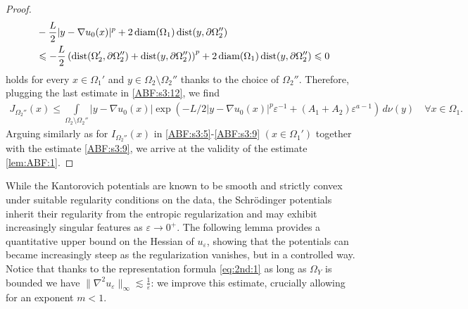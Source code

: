 \documentclass[reqno,12pt]{article}
\DeclareMathOperator{\dist}{dist}
\DeclareMathOperator{\diam}{diam}
\newcommand{\I}{\int\limits}
\begin{document}
\begin{proof}
\begin{align*}
    &-\frac{L}{2}|y-\nabla u_{0}(x)|^{p} + 2\diam(\Omega_{1})\dist(y,\partial\Omega_{2}'')
    \notag\\&
    \leqslant
    -\frac{L}{2}\left( \dist(\Omega_{2}',\partial \Omega_{2}'') + \dist(y,\partial \Omega_{2}'') \right)^{p} + 2\diam(\Omega_{1})\dist(y,\partial\Omega_{2}'') \leqslant 0 
\end{align*}
holds for every $x\in \Omega_{1}'$ and $y\in \Omega_{2}\setminus \Omega_{2}''$ thanks to the choice of $\Omega_{2}''$. Therefore, plugging the last estimate in \eqref{ABF:s3:12}, we find 
\begin{align*}
    J_{\Omega_{2}''}(x) \leqslant
    \I_{\Omega_{2}\setminus \Omega_{2}''} |y-\nabla u_{0}(x)|\exp\left(-L/2|y-\nabla u_{0}(x)|^{p}\varepsilon^{-1} + (A_{1}+A_{2})\varepsilon^{a-1}\right)\,d\nu(y)\quad
    \forall x\in\Omega_{1}.
\end{align*}
Arguing similarly as for $I_{\Omega_{2}''}(x)$ in \eqref{ABF:s3:5}-\eqref{ABF:s3:9} $(x\in \Omega_{1}')$ together with the estimate \eqref{ABF:s3:9}, we arrive at the validity of the estimate \eqref{lem:ABF:1}.

\end{proof}

While the Kantorovich potentials are known to be smooth and strictly convex under suitable regularity conditions on the data, the Schr\"odinger potentials inherit their regularity from the entropic regularization and may exhibit increasingly singular features as $\varepsilon \to 0^{+}$. The following lemma provides a quantitative upper bound on the Hessian of $u_\varepsilon$, showing that the potentials can became increasingly steep as the regularization vanishes, but in a controlled way. Notice that thanks to the representation formula \eqref{eq:2nd:1} as long as $\Omega_Y$ is bounded we have $\| \nabla^2 u_{\varepsilon} \|_{\infty} \lesssim \frac 1{\varepsilon}$: we improve this estimate, crucially allowing for an exponent $m <1$.
\end{document}
